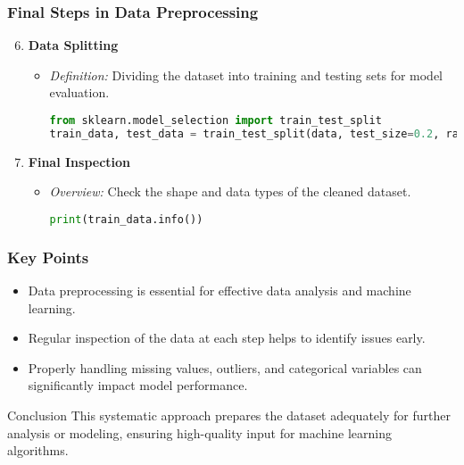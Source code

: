 \documentclass[aspectratio=169]{beamer}
\begin{document}
\begin{frame}[fragile]
    \frametitle{Final Steps in Data Preprocessing}
    \begin{enumerate}
        \setcounter{enumi}{5}
        \item \textbf{Data Splitting}
        \begin{itemize}
            \item \textit{Definition:} Dividing the dataset into training and testing sets for model evaluation.
            \begin{lstlisting}[language=Python]
from sklearn.model_selection import train_test_split
train_data, test_data = train_test_split(data, test_size=0.2, random_state=42)
            \end{lstlisting}
        \end{itemize}

        \item \textbf{Final Inspection}
        \begin{itemize}
            \item \textit{Overview:} Check the shape and data types of the cleaned dataset.
            \begin{lstlisting}[language=Python]
print(train_data.info())
            \end{lstlisting}
        \end{itemize}
    \end{enumerate}
\end{frame}

\begin{frame}[fragile]
    \frametitle{Key Points}
    \begin{itemize}
        \item Data preprocessing is essential for effective data analysis and machine learning.
        \item Regular inspection of the data at each step helps to identify issues early.
        \item Properly handling missing values, outliers, and categorical variables can significantly impact model performance.
    \end{itemize}

    \begin{block}{Conclusion}
        This systematic approach prepares the dataset adequately for further analysis or modeling, ensuring high-quality input for machine learning algorithms.
    \end{block}
\end{frame}
\end{document}
